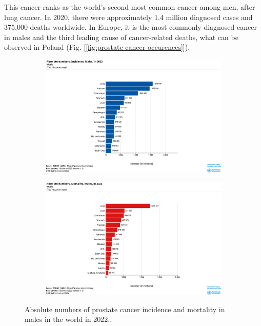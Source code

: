 This cancer ranks as the world's second most common cancer among men, after lung cancer. In 2020, there were approximately 1.4 million diagnosed cases and 375,000 deaths worldwide\cite{culp_recent_2020}.
In Europe, it is the most commonly diagnosed cancer in males and the third leading cause of cancer-related deaths, what can be observed in Poland (Fig. [\ref{fig:prostate-cancer-occurences}]). 

\begin{figure}[H]
\begin{subfigure}[b]{0.5\textwidth}
    \centering
    \includegraphics[width=1\linewidth]{background/graphic-absolute-numbers-inc-males-in-2022-world.png}
    \label{fig:pc-incidence-world}
\end{subfigure}
\begin{subfigure}[b]{0.5\textwidth}
    \centering
    \includegraphics[width=1\linewidth]{background/graphic-absolute-numbers-mort-males-in-2022-world.png}
    \label{fig:pc-mortality-world}
\end{subfigure}
\caption{Absolute numbers of prostate cancer incidence and mortality in males in the world in 2022.\cite{gco_cancer_today}.}
\end{figure}

